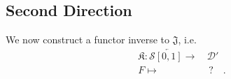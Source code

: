 \documentclass[a4paper, 11pt,reqno]{amsart}
\newcommand{\id}{\mathrm{id}}
\newcommand{\J}{\mathfrak{J}}
\DeclareMathOperator*{\colim}{colim}
\begin{document}

\subsection{Second Direction}\label{subsec:K2ndDIRECTION} We now construct a functor inverse to $\J$, i.e. 
\begin{align}
\mathfrak{K}\colon \mathcal{S}\overleftarrow{[0,1]} \longrightarrow & \,\mathcal{D}'\\
F \mapsto & \,\,  ? \,\,\,\,\,\,.\nonumber 
\end{align}
\end{document}
